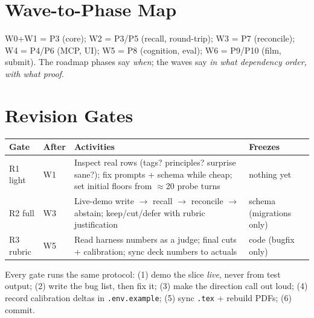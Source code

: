 \section{Wave-to-Phase Map}
W0+W1 = P3 (core); W2 = P3/P5 (recall, round-trip); W3 = P7 (reconcile); W4 = P4/P6 (MCP, UI);
W5 = P8 (cognition, eval); W6 = P9/P10 (film, submit). The roadmap phases say \emph{when}; the
waves say \emph{in what dependency order, with what proof}.

\section{Revision Gates}
\begin{longtable}{@{}p{}p{}p{}p{}@{}}
\toprule
Gate & After & Activities & Freezes \\
\midrule
R1 light & W1 & Inspect real rows (tags? principles? surprise sane?); fix prompts + schema while cheap; set initial floors from $\approx$20 probe turns & nothing yet \\
R2 full & W3 & Live-demo write $\rightarrow$ recall $\rightarrow$ reconcile $\rightarrow$ abstain; keep/cut/defer with rubric justification & schema (migrations only) \\
R3 rubric & W5 & Read harness numbers as a judge; final cuts + calibration; sync deck numbers to actuals & code (bugfix only) \\
\bottomrule
\end{longtable}
Every gate runs the same protocol: (1) demo the slice \emph{live}, never from test output;
(2) write the bug list, then fix it; (3) make the direction call out loud; (4) record
calibration deltas in \texttt{.env.example}; (5) sync \texttt{.tex} + rebuild PDFs; (6) commit.

